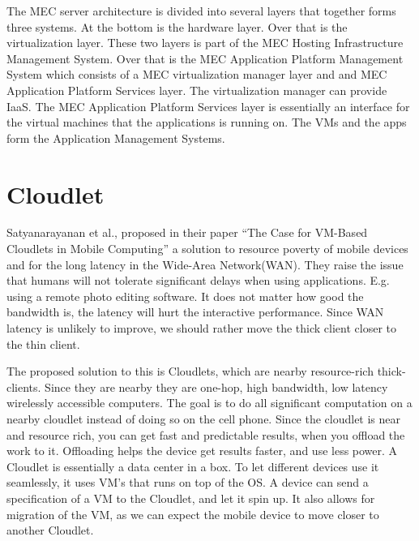 The MEC server architecture is divided into several layers that together forms three systems\cite{patel_mec_nodate}. At the bottom is the hardware layer. Over that is the virtualization layer. These two layers is part of the MEC Hosting Infrastructure Management System. Over that is the MEC Application Platform Management System which consists of a MEC virtualization manager layer and and MEC Application Platform Services layer. The virtualization manager can provide IaaS. The MEC Application Platform Services layer is essentially an interface for the virtual machines that the applications is running on. The VMs and the apps form the Application Management Systems.






\section{Cloudlet} \label{cloudlet} 
Satyanarayanan et al., proposed in their paper “The Case for VM-Based Cloudlets in Mobile Computing”\cite{satyanarayanan_case_2009} a solution to resource poverty of mobile devices and for the long latency in the Wide-Area Network(WAN). They raise the issue that humans will not tolerate significant delays when using applications. E.g. using a remote photo editing software. It does not matter how good the bandwidth is, the latency will hurt the interactive performance. Since WAN latency is unlikely to improve, we should rather move the thick client closer to the thin client. 

The proposed solution to this is Cloudlets, which are nearby resource-rich thick-clients. Since they are nearby they are one-hop, high bandwidth, low latency wirelessly accessible computers. The goal is to do all significant computation on a nearby cloudlet instead of doing so on the cell phone. Since the cloudlet is near and resource rich, you can get fast and predictable results, when you offload the work to it. Offloading helps the device get results faster, and use less power. A Cloudlet is essentially a data center in a box. To let different devices use it seamlessly, it uses VM’s that runs on top of the OS. A device can send a specification of a VM to the Cloudlet, and let it spin up. It also allows for migration of the VM, as we can expect the mobile device to move closer to another Cloudlet.


